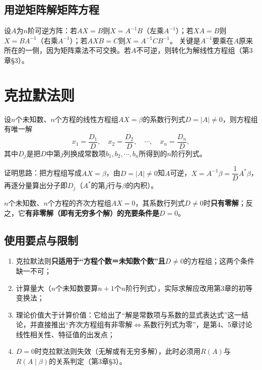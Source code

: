 
\subsection{用逆矩阵解矩阵方程}

设$A$为$n$阶可逆方阵：若$AX=B$则$X=A^{-1}B$（左乘$A^{-1}$）；若$XA=B$则$X=BA^{-1}$（右乘$A^{-1}$）；若$AXB=C$则$X=A^{-1}CB^{-1}$。
关键是$A^{-1}$要乘在$A$原来所在的一侧，因为矩阵乘法不可交换。若$A$不可逆，则转化为解线性方程组（第3章§3）。

\section{克拉默法则}

\begin{theorem}[克拉默法则]
设$n$个未知数、$n$个方程的线性方程组$AX=\beta$的系数行列式$D=|A|\neq0$，则方程组有唯一解
\[
x_1=\frac{D_1}{D},\quad x_2=\frac{D_2}{D},\quad\cdots,\quad x_n=\frac{D_n}{D},
\]
其中$D_j$是把$D$中第$j$列换成常数项$b_1,b_2,\cdots,b_n$所得到的$n$阶行列式。
\end{theorem}


证明思路：把方程组写成$AX=\beta$，由$D=|A|\neq0$知$A$可逆，$X=A^{-1}\beta=\dfrac{1}{D}A^{*}\beta$，再逐分量算出分子即$D_j$（$A^*$的第$j$行与$\beta$的内积）。

\begin{corollary}[齐次方程组]
$n$个未知数、$n$个方程的齐次方程组$AX=0$，其系数行列式$D\neq0$时\textbf{只有零解}；反之，它\textbf{有非零解（即有无穷多个解）的充要条件是}$D=0$。
\end{corollary}


\subsection{使用要点与限制}

\begin{enumerate}
\item 克拉默法则\textbf{只适用于“方程个数＝未知数个数”且$D\neq0$}的方程组；这两个条件缺一不可；
\item 计算量大（$n$个未知数要算$n+1$个$n$阶行列式），实际求解应改用第3章的初等变换法；
\item 理论价值大于计算价值：它给出了“解是常数项与系数的显式表达式”这一结论，并直接推出“齐次方程组有非零解$\iff$系数行列式为零”，是第4、5章讨论线性相关性、特征值的出发点；
\item $D=0$时克拉默法则失效（无解或有无穷多解），此时必须用$R(A)$与$R(A\mid\beta)$的关系判定（第3章§3）。
\end{enumerate}


